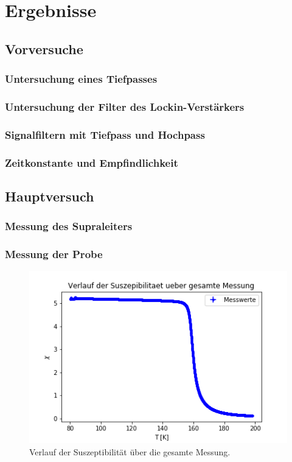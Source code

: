 \documentclass[12pt,a4paper]{article}
\begin{document}
\section{Ergebnisse}
\subsection{Vorversuche}
\subsubsection{Untersuchung eines Tiefpasses}
\subsubsection{Untersuchung der Filter des Lockin-Verstärkers}
\subsubsection{Signalfiltern mit Tiefpass und Hochpass}
\subsubsection{Zeitkonstante und Empfindlichkeit}
\subsection{Hauptversuch}
\subsubsection{Messung des Supraleiters}
\subsubsection{Messung der Probe}

\begin{figure}
\centering
\includegraphics[scale=1]{Bilder/Haupt_Probe/Suszeptibilitaet_Verlauf.png}
\caption[test]{Verlauf der Suszeptibilität über die gesamte Messung.}
\label{fig:Suszeptibilitaet_Verlauf}
\end{figure}
\end{document}
